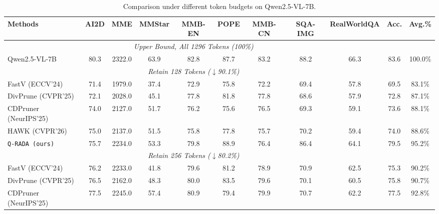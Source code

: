 \begin{table}[t]
    \centering

    \setlength{\tabcolsep}{3.5pt}
    \caption{Comparison under different token budgets on Qwen2.5-VL-7B.}
    \label{tab:token_budget_comparison}
    \small
    \begin{tabular}{l|cccccccc|cc}
        \toprule
        Methods
        & AI2D
        & MME
        & MMStar
        & MMB-EN
        & POPE
        & MMB-CN
        & SQA-IMG
        & RealWorldQA
        & Acc.
        & Avg.\% \\
        \midrule

        \multicolumn{9}{c}{\textit{Upper Bound, All 1296 Tokens (100\%)}} \\
        \midrule
        Qwen2.5-VL-7B
        & 80.3 & 2322.0 & 63.9 & 82.8 & 87.7 & 83.2 & 88.2& 66.3 & 83.6& 100.0\% \\
        \midrule

        \multicolumn{9}{c}{\textit{Retain 128 Tokens ($\downarrow$90.1\%)}} \\
        \midrule
        FastV (ECCV'24)
        & 71.4 & 1979.0 & 37.4 & 72.9 & 75.8& 72.2 &69.4 & 57.8 &69.5& 83.1\% \\
        DivPrune (CVPR'25)
        & 72.1 & 2028.0 & 45.1 & 77.8 & 81.8 & 77.8 &68.6 & 57.9& 72.8&87.1\% \\

        CDPruner (NeurIPS'25)
        & 74.0 & 2127.0 & 51.7 & 76.2 & 75.6 & 76.5&69.3 &59.1&73.6&88.1\% \\

        HAWK (CVPR'26)
        & 75.0 & 2137.0 & 51.5 & 75.8 & 77.8 & 75.7 & 70.2 & 59.4 & 74.0 & 88.6\% \\
        \rowcolor{gray!20}\texttt{Q-RADA (ours)}
        & 75.7
        & 2234.0
        & 53.3
        & 79.8
        & 88.9
        & 76.4
        & 86.4
        & 64.1
        & 79.5
        & 95.2\% \\
        \midrule

        \multicolumn{9}{c}{\textit{Retain 256 Tokens ($\downarrow$80.2\%)}} \\
        \midrule
        FastV (ECCV'24)
        & 76.2 & 2233.0 & 41.8 & 79.6 & 81.2& 78.9 &70.9 & 62.5 &75.3& 90.2\% \\
        DivPrune (CVPR'25)
        & 76.5 & 2162.0 & 48.3 & 80.0 & 83.5 & 79.6&70.1&60.5&75.8
        &90.7\% \\
        CDPruner (NeurIPS'25)
        & 77.5 & 2245.0 & 57.4 & 80.9 & 79.4& 79.9 &70.7&62.2&77.5& 92.8\% \\


\end{tabular}
\end{table}
